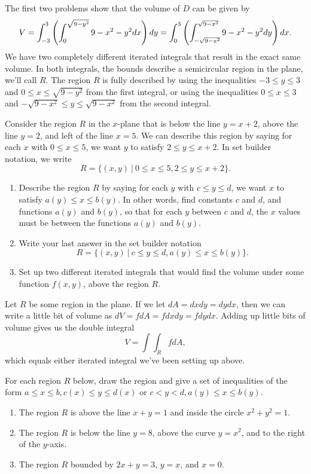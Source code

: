 The first two problems show that the volume of $D$ can be given by 
$$V=\displaystyle\int_{-3}^{3} \left(\int_0^{\sqrt{9-y^2}}9-x^2-y^2 dx\right) dy = \displaystyle\int_{0}^{3} \left(\int_{-\sqrt{9-x^2}}^{\sqrt{9-x^2}}9-x^2-y^2 dy\right) dx.$$
We have two completely different iterated integrals that result in the exact same volume. In both integrals, the bounds describe a semicircular region in the plane, we'll call $R$. The region $R$ is fully described by using the inequalities $-3\leq y\leq 3$ and $0\leq x\leq \sqrt{9-y^2}$ from the first integral, or using the inequalities $0\leq x\leq 3$ and $-\sqrt{9-x^2}\leq y\leq \sqrt{9-x^2}$ from the second integral. 

\begin{problem}
 Consider the region $R$ in the $x$-plane that is below the line $y=x+2$, above the line $y=2$, and left of the line $x=5$. We can describe this region by saying for each $x$ with $0\leq x\leq 5$, we want $y$ to satisfy $2\leq y\leq x+2$. In set builder notation, we write
$$R=\{(x,y)\ | \ 0\leq x\leq 5, 2\leq y\leq x+2\}.$$
\begin{enumerate}
 \item Describe the region $R$ by saying for each $y$ with $c\leq y\leq d$, we want $x$ to satisfy $a(y)\leq x\leq b(y)$. In other words, find constants $c$ and $d$, and functions $a(y)$ and $b(y)$, so that for each $y$ between $c$ and $d$, the $x$ values must be between the functions $a(y)$ and $b(y)$.
 \item Write your last answer in the set builder notation
$$R=\{(x,y)\ | \ c\leq y\leq d, a(y)\leq x\leq b(y)\}.$$
 \item Set up two different iterated integrals that would find the volume under some function $f(x,y)$, above the region $R$. 
\end{enumerate}
\end{problem}


Let $R$ be some region in the plane.  If we let $dA=dxdy=dydx$, then we can write a little bit of volume as $dV=fdA=fdxdy=fdydx.$ Adding up little bits of volume gives us the double integral 
$$V = \int\int_R fdA,$$
which equals either iterated integral we've been setting up above. 

\begin{problem}
For each region $R$ below, draw the region and give a set of inequalities of the form $a\leq x\leq b, c(x)\leq y\leq d(x)$ or $c<y<d, a(y)\leq x\leq b(y)$. 
\begin{enumerate}
 \item The region $R$ is above the line $x+y=1$ and inside the circle $x^2+y^2=1$.
 \item The region $R$ is below the line $y=8$, above the curve $y=x^2$, and to the right of the $y$-axis.
 \item The region $R$ bounded by $2x+y=3$, $y=x$, and $x=0$. 
\end{enumerate}
\end{problem}


